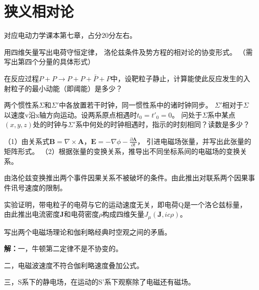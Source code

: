 \section{狭义相对论}
对应电动力学课本第七章，占分20分左右。

\begin{question}
    用四维矢量写出电荷守恒定律，
    洛伦兹条件及势方程的相对论的协变形式。
    （需写出第四个分量的具体形式）
\end{question}

\begin{question}
    在反应过程$P+P\rightarrow P+P+\bar P+P$中，设靶粒子静止，计算能使此反应发生的入射粒子的最小动能（即阈能）是多少？
\end{question}

\begin{question}
    两个惯性系$\Sigma $和$\Sigma' $中各放置若干时钟，同一惯性系中的诸时钟同步。
    $\Sigma '$相对于$\Sigma $以速度v沿x轴方向运动。设两系原点相遇时$t_0=t'_0=0$。
    问处于$\Sigma$系中某点$(x,y,z)$处的时钟与$\Sigma' $系中何处的时钟相遇时，指示的时刻相同？读数是多少？
\end{question}

\begin{question}
    （1）由关系式$\mathbf{B}=\nabla \times \mathbf{A}$，$\mathbf{E}=-\nabla \phi-\frac{\partial\mathbf{A}}{\partial t}$，
    引进电磁场张量，并写出此张量的矩阵形式。
    （2）根据张量的变换关系，推导出不同坐标系间的电磁场的变换关系。
\end{question}

\begin{question}
    由洛伦兹变换推出两个事件因果关系不被破坏的条件。由此推出对联系两个因果事件讯号速度的限制。
\end{question}

\begin{question}
    实验证明，带电粒子的电荷与它的运动速度无关，即电荷Q是一个洛仑兹标量，
    由此推出电流密度$\mathbf{J}$和电荷密度$\rho$构成四维矢量$J_\mu(\mathbf{J},i c \rho)$。
\end{question}

\begin{question}
    写出两个电磁场理论和伽利略经典时空观之间的矛盾。
\end{question}

\noindent\textbf{解：}一，牛顿第二定律不是不协变的。

二，电磁波速度不符合伽利略速度叠加公式。

三，S系下的静电场，在运动的S'系下观察除了电磁还有磁场。

